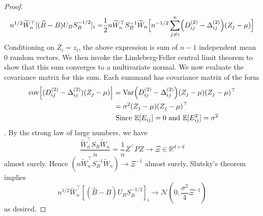 \begin{proof}
\begin{equation*}
    \begin{split}
        n^{1/2} \tilde{W}_n^\top [(\hat{B} - B) U_B S_B^{-1/2}]_{i} 
         =& \frac{1}{2} n \tilde{W}_n^\top S_B^{-1} \tilde{W}_n \Bigl[n^{-1/2} \sum_{j \neq i}^{n} \Bigl(D^{(2)}_{ij} - \Delta^{(2)}_{ij} \Bigr) (Z_j - \mu)\Bigr] \\  
    \end{split}
    \end{equation*} 
Conditioning on $Z_i = z_i$, the above expression is sum of $n-1$ independent mean $0$ random vectors. We then invoke the Lindeberg-Feller central limit theorem to show that this sum converges to a multivariate normal. We now evaluate the covariance matrix for this sum. Each summand has covariance matrix of the form
\begin{align*}
\mathrm{cov}\Bigl[(D^{(2)}_{ij} - \Delta^{(2)}_{ij} ) (Z_j - {\mu}) \Bigr] 
& = \mathrm{Var}\Bigl( D^{(2)}_{ij} - \Delta^{(2)}_{ij} \Bigr) (Z_j - {\mu}) (Z_j - {\mu})^\top\\
& = \sigma^2  (Z_j - {\mu}) (Z_j - {\mu})^\top \\
& \textrm{ Since } \mathbb{E}[E_{ij}] = 0 \textrm{ and }\mathbb{E}[E_{ij}^2] = \sigma^2
\end{align*}.
By the strong law of large numbers, we have
  $$\frac{\tilde{W}_n^\top S_B \tilde{W}_n}{n} = \frac{1}{n} Z^\top P Z \rightarrow \Xi \in \mathbb{R}^{d \times d}$$ almost surely. Hence $(n \tilde{W}_n^{\top} S_B^{-1} \tilde{W}_n) \rightarrow {\Xi}^{-1}$ almost surely. Slutsky's theorem implies $$ n^{1/2} \tilde{W}_n^\top [(\hat{B} - B) U_B S_B^{-1/2}]_{i} \longrightarrow \mathcal{N}(0, \frac{\sigma^2}{4}{\Xi}^{-1} )$$
  as desired.  
\end{proof} 

\begin{lemma}

\end{lemma}

